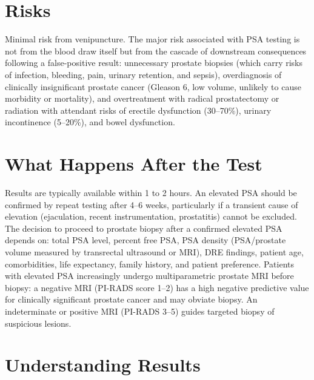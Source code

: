 \section*{Risks}
Minimal risk from venipuncture. The major risk associated with PSA testing is not from the blood draw itself but from the cascade of downstream consequences following a false-positive result: unnecessary prostate biopsies (which carry risks of infection, bleeding, pain, urinary retention, and sepsis), overdiagnosis of clinically insignificant prostate cancer (Gleason 6, low volume, unlikely to cause morbidity or mortality), and overtreatment with radical prostatectomy or radiation with attendant risks of erectile dysfunction (30--70\%), urinary incontinence (5--20\%), and bowel dysfunction.

\section*{What Happens After the Test}
Results are typically available within 1 to 2 hours. An elevated PSA should be confirmed by repeat testing after 4--6 weeks, particularly if a transient cause of elevation (ejaculation, recent instrumentation, prostatitis) cannot be excluded. The decision to proceed to prostate biopsy after a confirmed elevated PSA depends on: total PSA level, percent free PSA, PSA density (PSA/prostate volume measured by transrectal ultrasound or MRI), DRE findings, patient age, comorbidities, life expectancy, family history, and patient preference. Patients with elevated PSA increasingly undergo multiparametric prostate MRI before biopsy: a negative MRI (PI-RADS score 1--2) has a high negative predictive value for clinically significant prostate cancer and may obviate biopsy. An indeterminate or positive MRI (PI-RADS 3--5) guides targeted biopsy of suspicious lesions.

\section*{Understanding Results}

